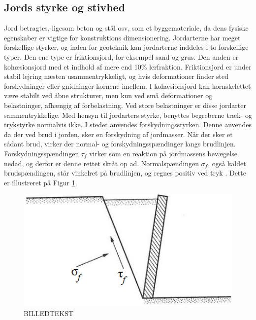 \subsection{Jords styrke og stivhed}
Jord betragtes, ligesom beton og stål osv, som et byggemateriale, da dens fysiske egenskaber er vigtige for konstruktions dimensionering.\citep{DGF} 
\newline \indent{     }  Jordarterne har meget forskellige styrker, og inden for geoteknik kan jordarterne inddeles i to forskellige typer. Den ene type er friktionsjord, for eksempel sand og grus. Den anden er kohæsionsjord med et indhold af mere end 10\% lerfraktion. 
Friktionsjord er under stabil lejring næsten usammentrykkeligt, og hvis deformationer finder sted forskydninger eller gnidninger kornene imellem.\citep{DGF}
\newline \indent{     }  I kohæsionsjord kan kornskelettet være stabilt ved åbne strukturer, men kun ved små deformationer og belastninger, afhængig af forbelastning. Ved store belastninger er disse jordarter sammentrykkelige.
\newline \indent{     }  Med hensyn til jordarters styrke, benyttes begreberne træk- og trykstyrke normalvis ikke. I stedet anvendes forskydningsstyrken. Denne anvendes da der ved brud i jorden, sker en forskydning af jordmasser. Når der sker et sådant brud, virker der normal- og forskydningsspændinger langs brudlinjen.\citep{geoteknik} Forskydningsspændingen $\tau_f$ virker som en reaktion på jordmassens bevægelse nedad, og derfor er denne rettet skråt op ad. Normalspændingen $\sigma_f$, også kaldet brudspændingen, står vinkelret på brudlinjen, og regnes positiv ved tryk \citep{geoteknik}. Dette er illustreret på Figur \ref{fig:poretrykket}. 

\begin{figure}[htbp] \centering
	\begin{minipage}[b]{0.48\textwidth}\centering
		\includegraphics[width=1.0\textwidth]{billeder/poretrykket.png}
		\caption{BILLEDTEKST}
		\label{fig:poretrykket}
	\end{minipage}\hfill
\end{figure}

